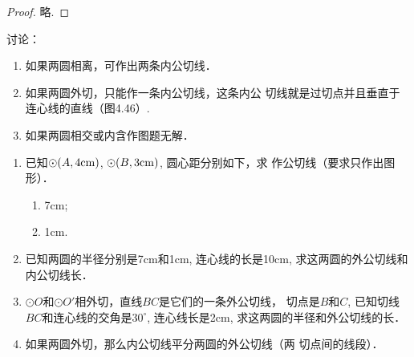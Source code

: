 \begin{proof}
  略.
\end{proof}

讨论：
\begin{enumerate}
\item 如果两圆相离，可作出两条内公切线．
\item 如果两圆外切，只能作一条内公切线，这条内公
切线就是过切点并且垂直于连心线的直线（图4.46）.
\item 如果两圆相交或内含作图题无解．
\end{enumerate}



\begin{ex}
\begin{enumerate}
    \item 已知$\odot(A,4{\rm cm})$, $\odot(B,3{\rm cm})$, 圆心距分别如下，求
    作公切线（要求只作出图形）．
\begin{multicols}{2}
    \begin{enumerate}
        \item 7cm;
        \item 1cm.
    \end{enumerate}
\end{multicols}
    \item 已知两圆的半径分别是7cm和1cm, 连心线的长是10cm, 
    求这两圆的外公切线和内公切线长．
    \item $\odot O$和$\odot O'$相外切，直线$BC$是它们的一条外公切线，
    切点是$B$和$C$, 已知切线$BC$和连心线的交角是$30^{\circ}$, 
    连心线长是2cm, 求这两圆的半径和外公切线的长．
    \item 如果两圆外切，那么内公切线平分两圆的外公切线（两
    切点间的线段）．
\end{enumerate}
\end{ex}

